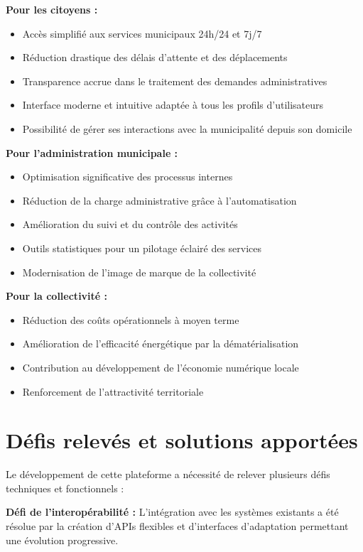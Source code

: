 \textbf{Pour les citoyens :}
\begin{itemize}
\item Accès simplifié aux services municipaux 24h/24 et 7j/7
\item Réduction drastique des délais d'attente et des déplacements
\item Transparence accrue dans le traitement des demandes administratives
\item Interface moderne et intuitive adaptée à tous les profils d'utilisateurs
\item Possibilité de gérer ses interactions avec la municipalité depuis son domicile
\end{itemize}

\textbf{Pour l'administration municipale :}
\begin{itemize}
\item Optimisation significative des processus internes
\item Réduction de la charge administrative grâce à l'automatisation
\item Amélioration du suivi et du contrôle des activités
\item Outils statistiques pour un pilotage éclairé des services
\item Modernisation de l'image de marque de la collectivité
\end{itemize}

\textbf{Pour la collectivité :}
\begin{itemize}
\item Réduction des coûts opérationnels à moyen terme
\item Amélioration de l'efficacité énergétique par la dématérialisation
\item Contribution au développement de l'économie numérique locale
\item Renforcement de l'attractivité territoriale
\end{itemize}

\section*{Défis relevés et solutions apportées}

Le développement de cette plateforme a nécessité de relever plusieurs défis techniques et fonctionnels :

\textbf{Défi de l'interopérabilité :} L'intégration avec les systèmes existants a été résolue par la création d'APIs flexibles et d'interfaces d'adaptation permettant une évolution progressive.

